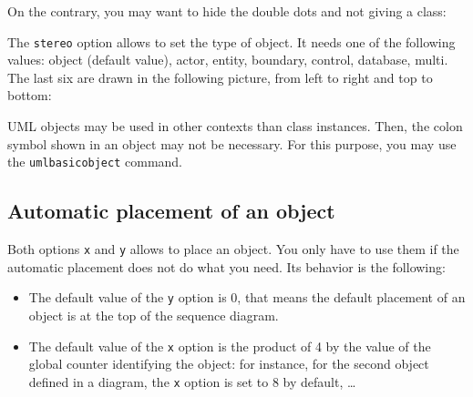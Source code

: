 \documentclass[a4paper,11pt]{report}
\begin{document}
\medskip

On the contrary, you may want to hide the double dots and not giving a class:

\medskip

\begin{minipage}{0.5\textwidth}
	
\end{minipage}
\begin{minipage}{0.5\textwidth}
	\begin{center}
	\end{center}
\end{minipage}

\medskip

The {\tt stereo} option allows to set the type of object. It needs one of the following values: object (default value), actor, entity, boundary, control, database, multi. The last six are drawn in the following picture, from left to right and top to bottom:

\medskip

\begin{minipage}{0.5\textwidth}
	
\end{minipage}
\begin{minipage}{0.5\textwidth}
	\begin{center}
	\end{center}
\end{minipage}

\medskip

UML objects may be used in other contexts than class instances. Then, the colon symbol shown in an object may not be necessary. For this purpose, you may use the {\tt umlbasicobject} command.

\subsection{Automatic placement of an object}\label{ss.objpos}

Both options {\tt x} and {\tt y} allows to place an object. You only have to use them if the automatic placement does not do what you need. Its behavior is the following:

\begin{itemize}
	\item The default value of the {\tt y} option is 0, that means the default placement of an object is at the top of the sequence diagram.
	\item The default value of the {\tt x} option is the product of 4 by the value of the global counter identifying the object: for instance, for the second object defined in a diagram, the {\tt x} option is set to 8 by default, \ldots
\end{itemize}
\end{document}
